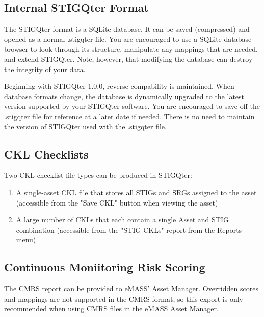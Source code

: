 \documentclass[letterpaper, 10pt, twoside]{article}
\begin{document}
\subsection{Internal STIGQter Format}

The STIGQter format is a SQLite database. It can be saved (compressed) and opened as a normal .stigqter file. You are encouraged to use a SQLite database browser to look through its structure, manipulate any mappings that are needed, and extend STIGQter. Note, however, that modifying the database can destroy the integrity of your data.

Beginning with STIGQter 1.0.0, reverse compability is maintained. When database formats change, the database is dynamically upgraded to the latest version supported by your STIGQter software. You are encouraged to save off the .stigqter file for reference at a later date if needed. There is no need to maintain the version of STIGQter used with the .stigqter file.

\subsection{CKL Checklists}

Two CKL checklist file types can be produced in STIGQter:

\begin{enumerate}
	\item A single-asset CKL file that stores all STIGs and SRGs assigned to the asset (accessible from the "Save CKL" button when viewing the asset)
	\item A large number of CKLs that each contain a single Asset and STIG combination (accessible from the "STIG CKLs" report from the Reports menu)
\end{enumerate}

\subsection{Continuous Moniitoring Risk Scoring}

The CMRS report can be provided to eMASS' Asset Manager. Overridden scores and mappings are not supported in the CMRS format, so this export is only recommended when using CMRS files in the eMASS Asset Manager.

\clearpage
\printbibliography
\end{document}
